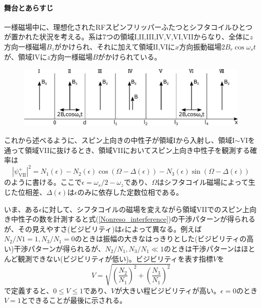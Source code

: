 \paragraph{舞台とあらすじ}
一様磁場中に、理想化されたRFスピンフリッパーふたつとシフタコイルひとつが置かれた状況を考える。系は7つの領域I,II,III,IV,V,VI,VIIからなり、全体に$z$方向一様磁場$B_z$がかけられ、それに加えて領域II,VIに$x$方向振動磁場$2B_r\cos\omega_s t$が、領域IVに$z$方向一様磁場$B$がかけられている。
\begin{figure}[h]
\centering
\includegraphics[height=3cm]{nonreso/resonance_setting2.pdf}
\end{figure}

これから述べるように、スピン上向きの中性子が領域Iから入射し、領域I$\sim$VIを通って領域VIIに抜けるとき、領域VIIにおいてスピン上向き中性子を観測する確率は
\begin{equation}
|\psi_\mathrm{VII}^+|^2=N_1(\epsilon)-N_2(\epsilon) \cos (\Omega -\Delta(\epsilon)) -N_3(\epsilon) \sin(\Omega-\Delta(\epsilon)) \label{Nonreso_interference}
\end{equation}
のように書ける。ここで$\epsilon=\omega_s/2-\omega_z$であり、$\Omega$はシフタコイル磁場によって生じた位相差、$\Delta(\epsilon)$は$\epsilon$のみに依存した定数位相である。

いま、ある$\epsilon$に対して、シフタコイルの磁場を変えながら領域VIIでのスピン上向き中性子の数を計測すると式(\ref{Nonreso_interference})の干渉パターンが得られるが、その見えやすさ(ビジビリティ)は$\epsilon$によって異なる。例えば$N_2/N1=1,N_3/N_1=0$のときは振幅の大きなはっきりとした(ビジビリティの高い)干渉パターンが得られるが、$N_2/N_1,N_3/N_1 \ll 1$のときは干渉パターンはほとんど観測できない(ビジビリティが低い)。ビジビリティを表す指標$V$を
\begin{equation}
V=\sqrt{\left(\frac{N_2}{N_1}\right)^2+\left(\frac{N_3}{N_1}\right)^2}
\end{equation}
で定義すると、$0 \le V \le 1$であり、$V$が大きい程ビジビリティが高い。$\epsilon=0$のとき$V=1$とできることが最後に示される。


